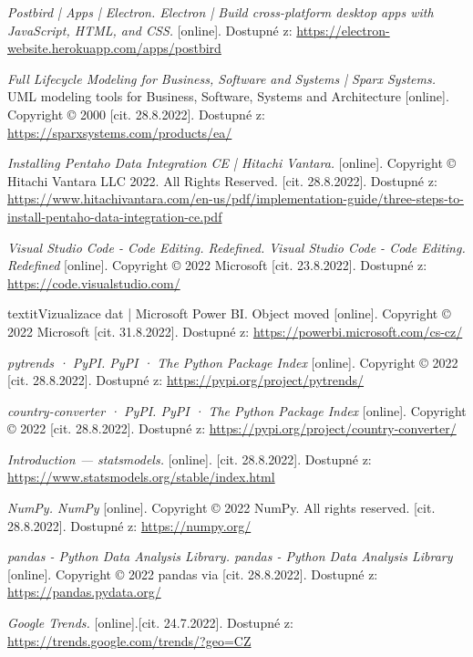 \documentclass[thesis=M,czech]{FITthesis}[2022/10/08]
\begin{document}
\begin{thebibliography}{99}
 \textit{Postbird | Apps | Electron. Electron | Build cross-platform desktop apps with JavaScript, HTML, and CSS.} [online]. Dostupné z: \url{https://electron-website.herokuapp.com/apps/postbird}

 \textit{Full Lifecycle Modeling for Business, Software and Systems | Sparx Systems.} UML modeling tools for Business, Software, Systems and Architecture [online]. Copyright © 2000 [cit. 28.8.2022]. Dostupné z: \url{https://sparxsystems.com/products/ea/}

 \textit{Installing Pentaho Data Integration CE | Hitachi Vantara.} [online]. Copyright © Hitachi Vantara LLC 2022. All Rights Reserved. [cit. 28.8.2022]. Dostupné z: \url{https://www.hitachivantara.com/en-us/pdf/implementation-guide/three-steps-to-install-pentaho-data-integration-ce.pdf}

 \textit{Visual Studio Code - Code Editing. Redefined. Visual Studio Code - Code Editing. Redefined} [online]. Copyright © 2022 Microsoft [cit. 23.8.2022]. Dostupné z: \url{https://code.visualstudio.com/}

 textit{Vizualizace dat | Microsoft Power BI. Object moved} [online]. Copyright © 2022 Microsoft [cit. 31.8.2022]. Dostupné z: \url{https://powerbi.microsoft.com/cs-cz/}

 \textit{pytrends · PyPI. PyPI · The Python Package Index} [online]. Copyright © 2022 [cit. 28.8.2022]. Dostupné z: \url{https://pypi.org/project/pytrends/}

 \textit{country-converter · PyPI. PyPI · The Python Package Index} [online]. Copyright © 2022 [cit. 28.8.2022]. Dostupné z: \url{https://pypi.org/project/country-converter/}

 \textit{Introduction — statsmodels.} [online]. [cit. 28.8.2022]. Dostupné z: \url{https://www.statsmodels.org/stable/index.html}

 \textit{NumPy. NumPy} [online]. Copyright © 2022 NumPy. All rights reserved. [cit. 28.8.2022]. Dostupné z: \url{https://numpy.org/}

 \textit{pandas - Python Data Analysis Library. pandas - Python Data Analysis Library} [online]. Copyright © 2022 pandas via [cit. 28.8.2022]. Dostupné z: \url{https://pandas.pydata.org/}

 \textit{Google Trends.} [online].[cit. 24.7.2022]. Dostupné z: \url{https://trends.google.com/trends/?geo=CZ}


\end{thebibliography}
\end{document}
